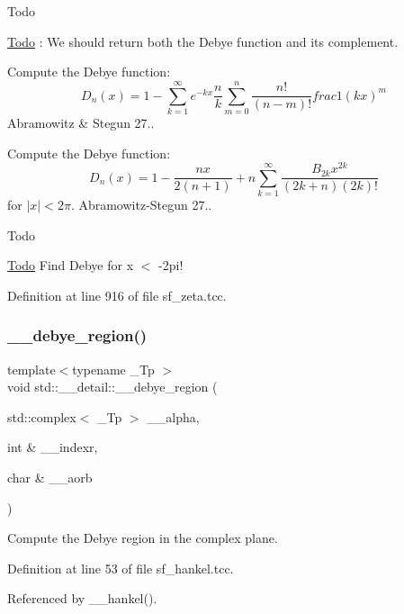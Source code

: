 \begin{DoxyRefDesc}{Todo}
\item[\hyperlink{todo__todo000020}{Todo}]\+: We should return both the Debye function and it\textquotesingle{}s complement. \end{DoxyRefDesc}
Compute the Debye function\+: \[ D_n(x) = 1 - \sum_{k = 1}^{\infty} e^{-kx} \frac{n}{k}\sum_{m=0}^{n}\frac{n!}{(n-m)!}frac{1}{(kx)^m} \] Abramowitz \& Stegun 27..

Compute the Debye function\+: \[ D_n(x) = 1 - \frac{n x}{2(n+1)} + n \sum_{k = 1}^{\infty} \frac{B_{2k} x^{2k}}{(2k + n)(2k)!} \] for $ |x| < 2\pi $. Abramowitz-\/\+Stegun 27..

\begin{DoxyRefDesc}{Todo}
\item[\hyperlink{todo__todo000021}{Todo}]Find Debye for x $<$ -\/2pi! \end{DoxyRefDesc}


Definition at line 916 of file sf\+\_\+zeta.\+tcc.

\mbox{\label{namespacestd_1_1____detail_a3212c0a136417e862f2ed8e9684e053c}} 
\subsubsection{\texorpdfstring{\+\_\+\+\_\+debye\+\_\+region()}{\_\_debye\_region()}}
{\footnotesize\ttfamily template$<$typename \+\_\+\+Tp $>$ \\
void std\+::\+\_\+\+\_\+detail\+::\+\_\+\+\_\+debye\+\_\+region (\begin{DoxyParamCaption}\item[{std\+::complex$<$ \+\_\+\+Tp $>$}]{\+\_\+\+\_\+alpha,  }\item[{int \&}]{\+\_\+\+\_\+indexr,  }\item[{char \&}]{\+\_\+\+\_\+aorb }\end{DoxyParamCaption})}

Compute the Debye region in the complex plane. 

Definition at line 53 of file sf\+\_\+hankel.\+tcc.



Referenced by \+\_\+\+\_\+hankel().

